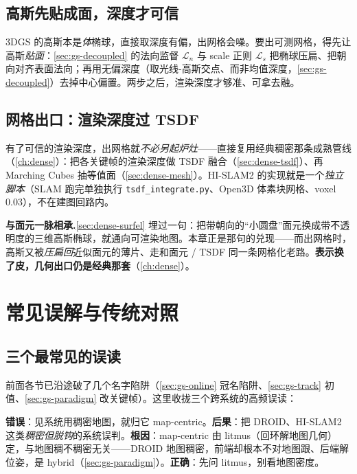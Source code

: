 \subsection{高斯先贴成面，深度才可信}

3DGS 的高斯本是\emph{体}椭球，直接取深度有偏，出网格会噪。要出可测网格，得先让高斯\emph{贴面}：\cref{sec:gs-decoupled} 的法向监督 $\mathcal L_n$ 与 scale 正则 $\mathcal L_s$ 把椭球压扁、把朝向对齐表面法向；再用无偏深度（取光线-高斯交点、而非均值深度，\cref{sec:gs-decoupled}）去掉中心偏置。两步之后，渲染深度才够准、可拿去融。

\subsection{网格出口：渲染深度过 TSDF}

有了可信的渲染深度，出网格就\emph{不必另起炉灶}——直接复用经典稠密那条成熟管线（\cref{ch:dense}）：把各关键帧的渲染深度做 TSDF 融合（\cref{sec:dense-tsdf}）、再 Marching Cubes 抽等值面（\cref{sec:dense-mesh}）。HI-SLAM2 的实现就是一个\emph{独立脚本}（SLAM 跑完单独执行 \texttt{tsdf\_integrate.\allowbreak py}、Open3D 体素块网格、voxel $0.03$），不在建图回路内。

\begin{note}
\textbf{与面元一脉相承.}\;\cref{sec:dense-surfel} 埋过一句：把带朝向的“小圆盘”面元换成带不透明度的三维高斯椭球，就通向可渲染地图。本章正是那句的兑现——而出网格时，高斯又被\emph{压扁回}近似面元的薄片、走和面元 / TSDF 同一条网格化老路。\textbf{表示换了皮，几何出口仍是经典那套}（\cref{ch:dense}）。
\end{note}

\section{常见误解与传统对照}
\label{sec:gs-pitfalls}

\subsection{三个最常见的误读}

前面各节已沿途破了几个名字陷阱（\cref{sec:gs-online} 冠名陷阱、\cref{sec:gs-track} 初值、\cref{sec:gs-paradigm} 改关键帧）。这里收拢三个跨系统的高频误读：

\begin{pitfall}
\textbf{错误}：见系统用稠密地图，就归它 map-centric。\textbf{后果}：把 DROID、HI-SLAM2 这类\emph{稠密但脱钩}的系统误判。\textbf{根因}：map-centric 由 litmus（回环解地图几何）定，与地图稠不稠密无关——DROID 地图稠密，前端却根本不对地图跟、后端解位姿，是 hybrid（\cref{sec:gs-paradigm}）。\textbf{正确}：先问 litmus，别看地图密度。
\end{pitfall}

